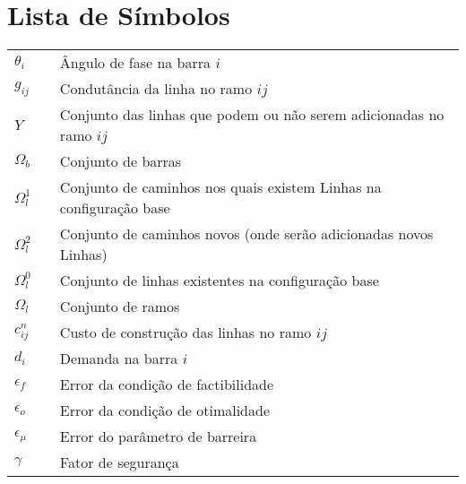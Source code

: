 \chapter*{Lista de Símbolos}

\vspace*{-0.5cm}

\onehalfspacing


\noindent
\begin{tabular}{l c p{.85\linewidth}}
$\theta_i$             & & Ângulo de fase na barra $i$\\

$g_{ij}$               & & Condutância da linha no ramo $ij$ \\

$Y$                    & & Conjunto das linhas que podem ou não serem adicionadas no ramo $ij$\\

$\Omega_b$             & & Conjunto de barras \\

$\Omega_l^1$           & & Conjunto de caminhos nos quais existem Linhas na configuração base\\

$\Omega_l^2$           & & Conjunto de caminhos novos (onde serão adicionadas novos Linhas)\\

$\Omega_l^0$           & & Conjunto de linhas existentes na configuração base\\

$\Omega_l$             & & Conjunto de ramos\\

$c^n_{ij}$             & & Custo de construção das linhas no ramo $ij$\\ 

$d_{i}$                & & Demanda na barra $i$\\

$\epsilon_f$           & & Error da condição de factibilidade \\

$\epsilon_o$           & & Error da condição de otimalidade\\

$\epsilon_{\mu}$       & & Error do parâmetro de barreira \\

$\gamma$               & & Fator de segurança \\


\end{tabular}
